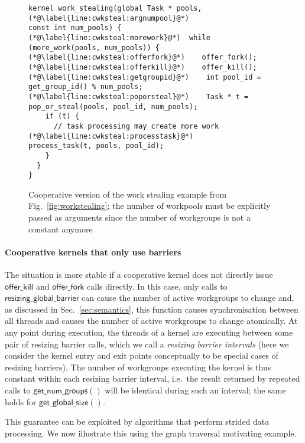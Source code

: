 \documentclass[numbers,nocopyrightspace,10pt]{sigplanconf}
\newcommand{\myfig}{Fig.~}
\newcommand{\mysec}{Sec.~}
\newcommand{\offerfork}{\mathsf{offer\_fork}}
\newcommand{\offerkill}{\mathsf{offer\_kill}}
\newcommand{\resizingglobalbarrier}{\mathsf{resizing\_global\_barrier}}
\newcommand{\getnumgroups}{\mathsf{get\_num\_groups}}
\newcommand{\getglobalsize}{\mathsf{get\_global\_size}}
\begin{document}
\begin{figure}

\begin{lstlisting}
kernel work_stealing(global Task * pools,
(*@\label{line:cwksteal:argnumpool}@*)                     const int num_pools) {
(*@\label{line:cwksteal:morework}@*)  while (more_work(pools, num_pools)) {
(*@\label{line:cwksteal:offerfork}@*)    offer_fork();
(*@\label{line:cwksteal:offerkill}@*)    offer_kill();
(*@\label{line:cwksteal:getgroupid}@*)    int pool_id = get_group_id() % num_pools;
(*@\label{line:cwksteal:poporsteal}@*)    Task * t = pop_or_steal(pools, pool_id, num_pools);
    if (t) {
      // task processing may create more work
(*@\label{line:cwksteal:processtask}@*)      process_task(t, pools, pool_id);
    }
  }
}
\end{lstlisting}

\caption{Cooperative version of the work stealing example from \myfig\ref{fig:workstealing}; the number of workpools
must be explicitly passed as arguments since the number of workgroups
is not a constant anymore}\label{fig:workstealing-cooperative}
\end{figure}

\paragraph{Cooperative kernels that only use barriers}

The situation is more stable if a cooperative kernel does not directly
issue $\offerkill$ and $\offerfork$ calls directly.  In this case,
only calls to $\resizingglobalbarrier$ can cause the number of active
workgroups to change and, as discussed in \mysec\ref{sec:semantics},
this function causes synchronisation between all threads and causes
the number of active workgroups to change atomically.  At any point
during execution, the threads of a kernel are executing between some
pair of resizing barrier calls, which we call a \emph{resizing barrier
  intervals} (here we consider the kernel entry and exit points
conceptually to be special cases of resizing barriers).  The number of
workgroups executing the kernel is thus constant within each resizing
barrier interval, i.e.\ the result returned by repeated calls to
$\getnumgroups()$ will be identical during such an interval; the same holds for $\getglobalsize()$.

This guarantee can be exploited by algorithms that perform strided
data processing.  We now illustrate this using the graph traversal motivating example.
\end{document}
